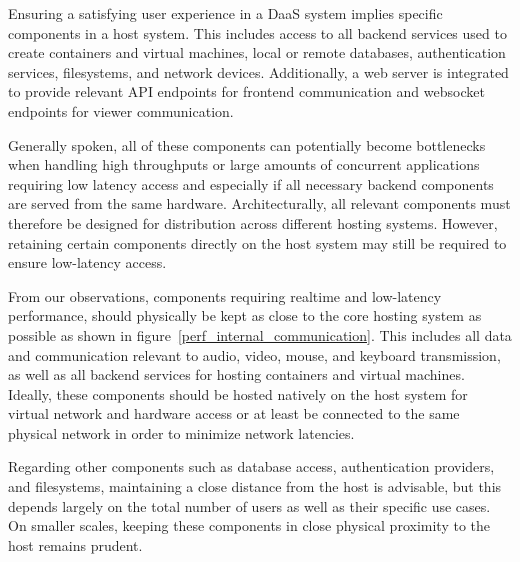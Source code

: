 \documentclass[runningheads]{llncs}
\begin{document}
Ensuring a satisfying user experience in a DaaS system
implies specific components in a host system.
This includes access to all backend services
used to create containers and virtual machines,
local or remote databases, authentication services, filesystems, and network devices.
Additionally, a web server is integrated to provide relevant API endpoints
for frontend communication and websocket endpoints for viewer communication.

Generally spoken, all of these components can potentially become bottlenecks
when handling high throughputs or large amounts of concurrent applications
requiring low latency access and especially if all necessary backend components
are served from the same hardware.
Architecturally, all relevant components
must therefore be designed for distribution across different hosting systems.
However, retaining certain components directly on the host system
may still be required to ensure low-latency access.

From our observations, components requiring realtime and low-latency performance,
should physically be kept as close to the core hosting system as possible
as shown in figure~\ref{perf_internal_communication}.
This includes all data and communication relevant to
audio, video, mouse, and keyboard transmission,
as well as all backend services for hosting containers and virtual machines.
Ideally, these components should be hosted natively on the host system
for virtual network and hardware access
or at least be connected to the same physical network
in order to minimize network latencies.

Regarding other components such as database access,
authentication providers, and filesystems,
maintaining a close distance from the host is advisable,
but this depends largely on the total number of users
as well as their specific use cases.
On smaller scales, keeping these components
in close physical proximity to the host remains prudent.
\end{document}

